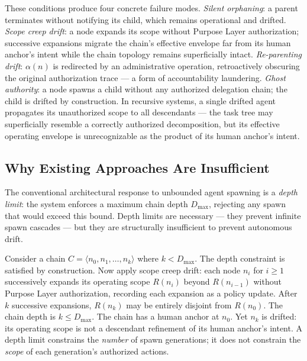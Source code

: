 These conditions produce four concrete failure modes. \emph{Silent orphaning}: a parent terminates without notifying its child, which remains operational and drifted. \emph{Scope creep drift}: a node expands its scope without Purpose Layer authorization; successive expansions migrate the chain's effective envelope far from its human anchor's intent while the chain topology remains superficially intact. \emph{Re-parenting drift}: $\alpha(n)$ is redirected by an administrative operation, retroactively obscuring the original authorization trace — a form of accountability laundering. \emph{Ghost authority}: a node spawns a child without any authorized delegation chain; the child is drifted by construction. In recursive systems, a single drifted agent propagates its unauthorized scope to all descendants — the task tree may superficially resemble a correctly authorized decomposition, but its effective operating envelope is unrecognizable as the product of its human anchor's intent.

\subsection{Why Existing Approaches Are Insufficient}

The conventional architectural response to unbounded agent spawning is a \emph{depth limit}: the system enforces a maximum chain depth $D_{\max}$, rejecting any spawn that would exceed this bound. Depth limits are necessary — they prevent infinite spawn cascades — but they are structurally insufficient to prevent autonomous drift.

Consider a chain $C = \langle n_0, n_1, \ldots, n_k \rangle$ where $k < D_{\max}$. The depth constraint is satisfied by construction. Now apply scope creep drift: each node $n_i$ for $i \geq 1$ successively expands its operating scope $R(n_i)$ beyond $R(n_{i-1})$ without Purpose Layer authorization, recording each expansion as a policy update. After $k$ successive expansions, $R(n_k)$ may be entirely disjoint from $R(n_0)$. The chain depth is $k \leq D_{\max}$. The chain has a human anchor at $n_0$. Yet $n_k$ is drifted: its operating scope is not a descendant refinement of its human anchor's intent. A depth limit constrains the \emph{number} of spawn generations; it does not constrain the \emph{scope} of each generation's authorized actions.

